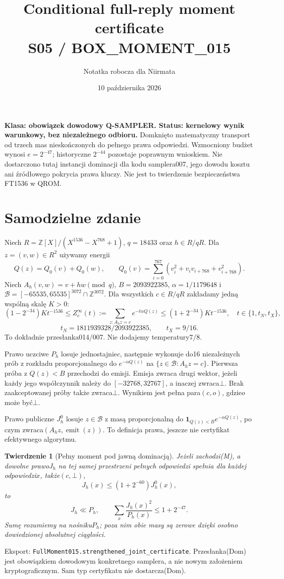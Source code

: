 \documentclass[11pt,a4paper]{article}
\title{Conditional full-reply moment certificate\\\large S05 / BOX\_MOMENT\_015}
\author{Notatka robocza dla Niirmata}\date{10 października 2026}
\newcommand{\code}[1]{\nolinkurl{#1}}
\newtheorem{theorem}{Twierdzenie}
\begin{document}
\maketitle
\textbf{Klasa: obowiązek dowodowy Q-SAMPLER. Status: kernelowy wynik
warunkowy, bez niezależnego odbioru.} Domknięto matematyczny transport od
trzech mas nieskończonych do pełnego prawa odpowiedzi. Wzmocniony budżet
wynosi $e=2^{-47}$; historyczne $2^{-44}$ pozostaje poprawnym wnioskiem.
Nie dostarczono tutaj instancji dominacji dla kodu samplera007, jego dowodu
kosztu ani źródłowego pokrycia prawa kluczy. Nie jest to twierdzenie
bezpieczeństwa FT1536 w QROM.

\section{Samodzielne zdanie}
Niech $R=\mathbb Z[X]/(X^{1536}-X^{768}+1)$, $q=18433$ oraz
$h\in R/qR$. Dla $z=(v,w)\in R^2$ używamy energii
\[
 Q(z)=Q_0(v)+Q_0(w),\qquad
 Q_0(v)=\sum_{i=0}^{767}(v_i^2+v_i v_{i+768}+v_{i+768}^2).
\]
Niech $A_h(v,w)=v+hw\pmod q$, $B=2093922385$, $\alpha=1/1179648$
i $\mathcal B=[-65535,65535]^{3072}\cap\mathbb Z^{3072}$.
Dla wszystkich $c\in R/qR$ zakładamy jedną wspólną skalę $K>0$:
\[
 (1-2^{-34})K t^{-1536}\le Z^\infty_c(t)
 :=\sum_{z:A_hz=c}e^{-t\alpha Q(z)}
 \le(1+2^{-34})K t^{-1536},\quad
 t\in\{1,t_N,t_X\},
\]
\[
 t_N=1811939328/2093922385,\qquad t_X=9/16. \tag{M}
\]
To dokładnie przesłanka014/007. Nie dodajemy temperatury$7/8$.

Prawo uczciwe $P_h$ losuje jednostajnie$c$, następnie wykonuje do16
niezależnych prób z rozkładu proporcjonalnego do $e^{-\alpha Q(z)}$ na
$\{z\in\mathcal B:A_hz=c\}$. Pierwsza próba z $Q(z)<B$ przechodzi do
emisji. Emisja zwraca drugi wektor, jeżeli każdy jego współczynnik należy do
$[-32768,32767]$, a inaczej zwraca$\bot$. Brak zaakceptowanej próby także
zwraca$\bot$. Wynikiem jest pełna para$(c,o)$, gdzie$o$ może być$\bot$.

Prawo publiczne $J^0_h$ losuje $z\in\mathcal B$ z masą proporcjonalną do
$\mathbf1_{Q(z)<B}e^{-\alpha Q(z)}$, po czym zwraca$(A_hz,\operatorname{emit}(z))$.
To definicja prawa, jeszcze nie certyfikat efektywnego algorytmu.

\begin{theorem}[Pełny moment pod jawną dominacją]
Jeżeli zachodzi(M), a dowolne prawo$J_h$ na tej samej przestrzeni pełnych
odpowiedzi spełnia dla \emph{każdej} odpowiedzi$x$, także$(c,\bot)$,
\[
 J_h(x)\le (1+2^{-60})J^0_h(x), \tag{Dom}
\]
to
\[
 J_h\ll P_h,\qquad \sum_x\frac{J_h(x)^2}{P_h(x)}\le1+2^{-47}.
\]
Sumę rozumiemy na nośniku$P_h$; poza nim obie masy są zerowe dzięki
osobno dowiedzionej absolutnej ciągłości.
\end{theorem}
Eksport: \code{FullMoment015.strengthened_joint_certificate}.
Przesłanka(Dom) jest obowiązkiem dowodowym konkretnego samplera, a nie
nowym założeniem kryptograficznym. Sam typ certyfikatu nie dostarcza(Dom).
\end{document}
